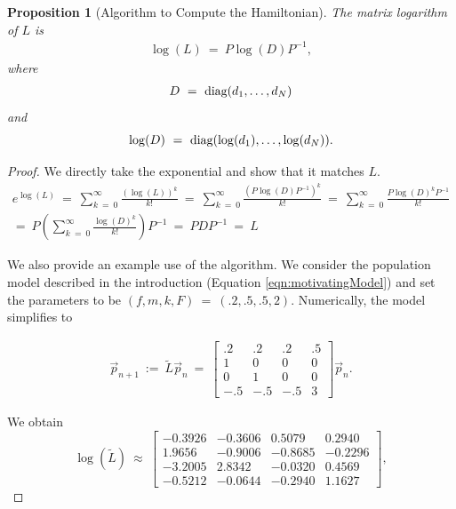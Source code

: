 \documentclass[11pt,reqno]{amsart}
\numberwithin{equation}{section}
\newtheorem{prop}[thm]{Proposition}
\theoremstyle{plain}
\begin{document}
\begin{prop}[Algorithm to Compute the Hamiltonian]
     The matrix logarithm of $L$ is
    \begin{eqnarray}
        \log(L) \ = \ P \log(D) P^{-1},
    \end{eqnarray}
    where 
    \begin{eqnarray}
        D \ = \ \textnormal{diag}( d_1, \dots, d_N)
    \end{eqnarray}
    and 
    \begin{equation}
        \log(D) \ = \ \textnormal{diag}( \log(d_1), \dots, \log(d_N)).
    \end{equation}
\end{prop}

\begin{proof}
    We directly take the exponential and show that it matches $L$. 
    \begin{eqnarray}
        e^{\log(L)} \ = \ 
        \sum_{k \ = \  0}^\infty 
        \frac {(\log(L))^k} {k!}\ = \ 
        \sum_{k \ = \  0}^\infty 
        \frac {(P \log(D) P^{-1})^k} {k!}\ = \ 
        \sum_{k \ = \  0}^\infty 
        \frac {P \log(D)^k P^{-1}} {k!} \nonumber 
        \\ 
        = \ P\left( \sum_{k \ = \  0}^\infty 
        \frac {\log(D)^k}{k!}\right) P^{-1} \ = \ PDP^{-1} \ = \ L
    \end{eqnarray}

We also provide an example use of the algorithm. We consider the population model described in the introduction (Equation \ref{eqn:motivatingModel}) and set the parameters to be 
$(f, m, k, F) \ = \ (.2, .5, .5, 2)$. Numerically, the model simplifies to

\begin{eqnarray}\label{eqn:motivatingModelEx}
    \vec p_{n + 1} \ :=\ \widetilde L\vec p_n \ = \ 
    \begin{bmatrix}
        .2 & .2 & .2 & .5\\ 
        1 & 0 & 0 & 0\\
        0 & 1 & 0 & 0 \\ 
        -.5 & -.5 & -.5 & 3
    \end{bmatrix}\vec p_n.
\end{eqnarray}

We obtain
\begin{equation}
    \log\left(\widetilde L\right) \ \approx \ 
    \begin{bmatrix}
-0.3926 & -0.3606 & 0.5079 & 0.2940 \\
1.9656 & -0.9006 & -0.8685 & -0.2296 \\
-3.2005 & 2.8342 & -0.0320 & 0.4569 \\
-0.5212 & -0.0644 & -0.2940 & 1.1627
\end{bmatrix},
\end{equation}


\end{proof}
\end{document}
